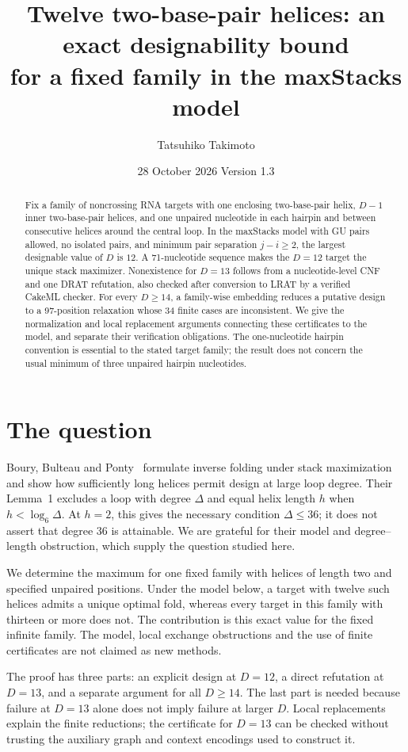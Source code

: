 \documentclass[11pt,a4paper]{article}
\title{Twelve two-base-pair helices: an exact designability bound\protect\\
for a fixed family in the maxStacks model}
\author{Tatsuhiko Takimoto}
\date{28 October 2026 \quad Version 1.3}
\theoremstyle{definition}
\begin{document}
\maketitle
\begin{abstract}
Fix a family of noncrossing RNA targets with one enclosing two-base-pair
helix, $D-1$ inner two-base-pair helices, and one unpaired nucleotide in
each hairpin and between consecutive helices around the central loop.
In the maxStacks model with GU pairs allowed, no isolated pairs, and
minimum pair separation $j-i\geq2$, the largest designable value of $D$
is $12$. A 71-nucleotide sequence makes the $D=12$ target the unique
stack maximizer. Nonexistence for $D=13$ follows from a nucleotide-level
CNF and one DRAT refutation, also checked after conversion to LRAT
by a verified CakeML checker. For every $D\geq14$, a family-wise embedding
reduces a putative design to a 97-position relaxation whose 34 finite
cases are inconsistent. We give the normalization and local replacement
arguments connecting these certificates to the model, and separate
their verification obligations. The one-nucleotide hairpin convention
is essential to the stated target family; the result does not concern
the usual minimum of three unpaired hairpin nucleotides.
\end{abstract}

\section{The question}
Boury, Bulteau and Ponty~\cite{BBP} formulate inverse folding under stack
maximization and show how sufficiently long helices permit design at
large loop degree. Their Lemma~1 excludes a loop with degree $\Delta$
and equal helix length $h$ when $h<\log_6\Delta$. At $h=2$, this gives
the necessary condition $\Delta\leq36$; it does not assert that degree
$36$ is attainable. We are grateful for their model and degree--length
obstruction, which supply the question studied here.

We determine the maximum for one fixed family with helices of length
two and specified unpaired positions. Under the model below, a target
with twelve such helices admits a unique optimal fold, whereas every
target in this family with thirteen or more does not. The contribution
is this exact value for the fixed infinite family. The model, local
exchange obstructions and the use of finite certificates are not
claimed as new methods.

The proof has three parts: an explicit design at $D=12$, a direct
refutation at $D=13$, and a separate argument for all $D\geq14$.
The last part is needed because failure at $D=13$ alone does not imply
failure at larger $D$. Local replacements explain the finite reductions;
the certificate for $D=13$ can be checked without trusting the auxiliary
graph and context encodings used to construct it.
\end{document}
